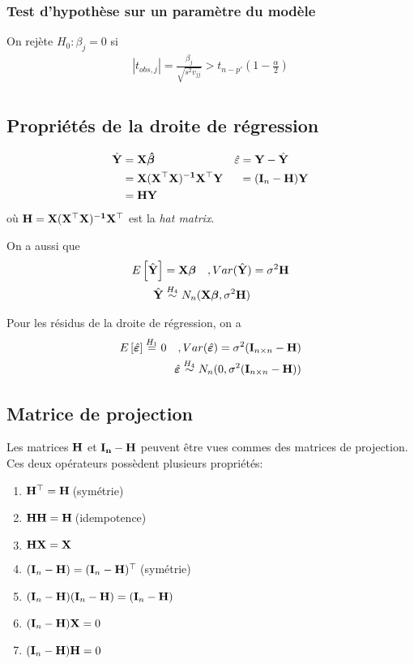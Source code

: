 \documentclass[10pt, french]{article}
\begin{document}
\begin{multicols*}{3}
\subsubsection*{Test d'hypothèse sur un paramètre du modèle}
On rejète $H_0 : \beta_j = 0$ si
\begin{align*}
|t_{obs, j}| = \frac{\beta_j}{\sqrt{s^2 v_{jj}} } > t_{n-p'}\left(1 - \frac{\alpha}{2} \right) \\
\end{align*}

\subsection*{Propriétés de la droite de régression}
\begin{align*}
	\hat{\mathbf{Y}}	& = \mathbf{X} \bm{\hat{\beta}}  &&\hat{\varepsilon} = \mathbf{Y} - \hat{\mathbf{Y}}\\
		& = \mathbf{X(X^\top X)^{-1} X^\top Y} && \:\:= (\mathbf{I}_n - \mathbf{H})\mathbf{Y}	\\
		& = \mathbf{H Y} 
\end{align*}	
où $\mathbf{H = X(X^\top X)^{-1}X^\top}$ est la \textit{hat matrix}.

On a aussi que
\begin{align*}
E \left[ \hat{\mathbf{Y}} \right] & = \mathbf{X} \bm{\beta} \quad , Var(\hat{\mathbf{Y}}) = \sigma^2 \mathbf{H} \\
\hat{\mathbf{Y}} & \overset{H_4}{\sim} N_n(\mathbf{X} \bm{\beta} , \sigma^2 \mathbf{H}) \\
\end{align*}

Pour les résidus de la droite de régression, on a
\begin{align*}
E \left[ \hat{\bm{\varepsilon}} \right]  \overset{H_1}{=} 0 \quad , Var(\hat{\bm{\varepsilon}}) = \sigma^2(\mathbf{I}_{n \times n} - \mathbf{H}) \\
\hat{\bm{\varepsilon}} \overset{H_4}{\sim} N_n(0, \sigma^2 (\mathbf{I}_{n \times n} - \mathbf{H})) \\
\end{align*}

\subsection*{Matrice de projection}
Les matrices $\mathbf{H}$ et $\mathbf{I_n - H}$ peuvent être vues commes des matrices de projection. Ces deux opérateurs possèdent plusieurs propriétés:
\begin{enumerate}
	\item $\mathbf{H}^\top = \mathbf{H}\:$(symétrie)
	\item $\mathbf{H}\mathbf{H} = \mathbf{H}\:$(idempotence)
	\item $\mathbf{HX} = \mathbf{X}$
	\item $(\mathbf{I}_n - \mathbf{H}) = (\mathbf{I}_n - \mathbf{H})^\top \:$(symétrie)
	\item $(\mathbf{I}_n - \mathbf{H})(\mathbf{I}_n - \mathbf{H}) = (\mathbf{I}_n - \mathbf{H})$
	\item $(\mathbf{I}_n - \mathbf{H})\mathbf{X} = 0 $
	\item $(\mathbf{I}_n - \mathbf{H})\mathbf{H} = 0 $
\end{enumerate}


\end{multicols*}
\end{document}

